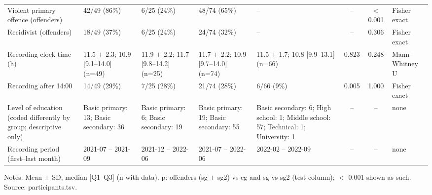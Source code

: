 \begin{table}[htbp]
{\begin{tabular}{p{3.2cm}p{2.6cm}p{2.6cm}p{2.6cm}p{2.6cm}ccl}
Violent primary offence (offenders) & 42/49 (86\%) & 6/25 (24\%) & 48/74 (65\%) & -- & -- & $<$ 0.001 & Fisher exact \\
Recidivist (offenders) & 18/49 (37\%) & 6/25 (24\%) & 24/74 (32\%) & -- & -- & 0.306 & Fisher exact \\
Recording clock time (h) & 11.5 $\pm$ 2.3; 10.9 [9.1--14.0] (n=49) & 11.9 $\pm$ 2.2; 11.7 [9.8--14.2] (n=25) & 11.7 $\pm$ 2.2; 10.9 [9.7--14.0] (n=74) & 11.5 $\pm$ 1.7; 10.8 [9.9--13.1] (n=66) & 0.823 & 0.248 & Mann--Whitney U \\
Recording after 14:00 & 14/49 (29\%) & 7/25 (28\%) & 21/74 (28\%) & 6/66 (9\%) & 0.005 & 1.000 & Fisher exact \\
Level of education (coded differently by group; descriptive only) & Basic primary: 13; Basic secondary: 36 & Basic primary: 6; Basic secondary: 19 & Basic primary: 19; Basic secondary: 55 & Basic secondary: 6; High school: 1; Middle school: 57; Technical: 1; University: 1 & -- & -- & none \\
Recording period (first--last month) & 2021-07 -- 2021-09 & 2021-12 -- 2022-06 & 2021-07 -- 2022-06 & 2022-02 -- 2022-09 & -- & -- & none \\
\bottomrule
\end{tabular}
}
\par\smallskip
\begin{minipage}{\textwidth}\raggedright\scriptsize
Notes. Mean $\pm$ SD; median [Q1--Q3] (n with data). p: offenders (sg + sg2) vs cg and sg vs sg2 (test column); $<$ 0.001 shown as such. Source: participants.tsv.
\end{minipage}
\end{table}
